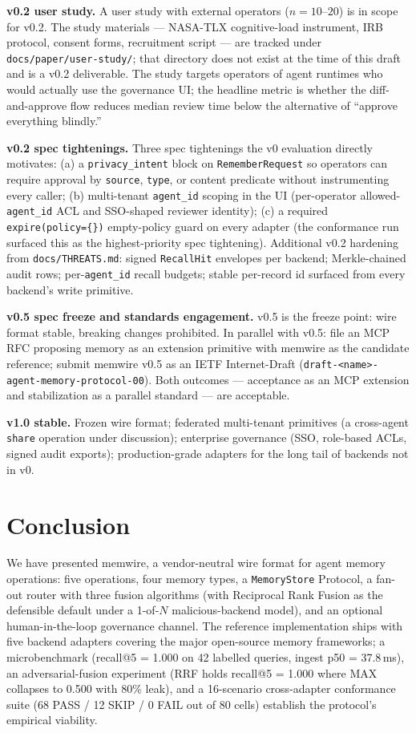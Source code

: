 \documentclass[11pt,letterpaper,twocolumn]{article}
\begin{document}
\textbf{v0.2 user study.} A user study with external operators ($n=10$--$20$) is in scope for v0.2. The study materials --- NASA-TLX cognitive-load instrument, IRB protocol, consent forms, recruitment script --- are tracked under \texttt{docs/paper/user-study/}; that directory does not exist at the time of this draft and is a v0.2 deliverable. The study targets operators of agent runtimes who would actually use the governance UI; the headline metric is whether the diff-and-approve flow reduces median review time below the alternative of ``approve everything blindly.''

\textbf{v0.2 spec tightenings.} Three spec tightenings the v0 evaluation directly motivates: (a) a \texttt{privacy\_intent} block on \texttt{RememberRequest} so operators can require approval by \texttt{source}, \texttt{type}, or content predicate without instrumenting every caller; (b) multi-tenant \texttt{agent\_id} scoping in the UI (per-operator allowed-\texttt{agent\_id} ACL and SSO-shaped reviewer identity); (c) a required \texttt{expire(policy=\{\})} empty-policy guard on every adapter (the  conformance run surfaced this as the highest-priority spec tightening). Additional v0.2 hardening from \texttt{docs/THREATS.md}: signed \texttt{RecallHit} envelopes per backend; Merkle-chained audit rows; per-\texttt{agent\_id} recall budgets; stable per-record id surfaced from every backend's write primitive.

\textbf{v0.5 spec freeze and standards engagement.} v0.5 is the freeze point: wire format stable, breaking changes prohibited. In parallel with v0.5: file an MCP RFC proposing memory as an extension primitive with memwire as the candidate reference; submit memwire v0.5 as an IETF Internet-Draft (\texttt{draft-<name>-agent-memory-protocol-00}). Both outcomes --- acceptance as an MCP extension and stabilization as a parallel standard --- are acceptable.

\textbf{v1.0 stable.} Frozen wire format; federated multi-tenant primitives (a cross-agent \texttt{share} operation under discussion); enterprise governance (SSO, role-based ACLs, signed audit exports); production-grade adapters for the long tail of backends not in v0.

\section{Conclusion}
\label{sec:conclusion}

We have presented memwire, a vendor-neutral wire format for agent memory operations: five operations, four memory types, a \texttt{MemoryStore} Protocol, a fan-out router with three fusion algorithms (with Reciprocal Rank Fusion as the defensible default under a 1-of-$N$ malicious-backend model), and an optional human-in-the-loop governance channel. The reference implementation ships with five backend adapters covering the major open-source memory frameworks; a microbenchmark (recall@5 = 1.000 on 42 labelled queries, ingest p50 = 37.8\,ms), an adversarial-fusion experiment (RRF holds recall@5 = 1.000 where MAX collapses to 0.500 with 80\% leak), and a 16-scenario cross-adapter conformance suite (68 PASS / 12 SKIP / 0 FAIL out of 80 cells) establish the protocol's empirical viability.
\end{document}
